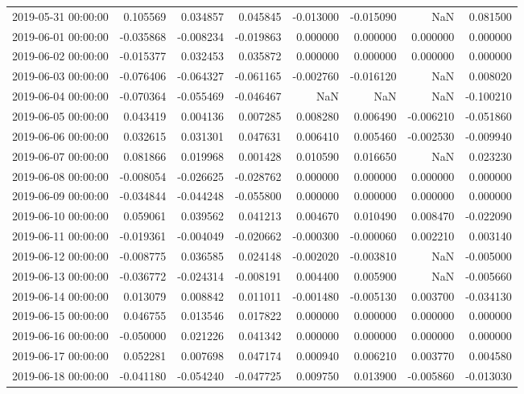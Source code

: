 \begin{tabular}{lrrrrrrr}
2019-05-31 00:00:00 & 0.105569 & 0.034857 & 0.045845 & -0.013000 & -0.015090 & NaN & 0.081500 \\
2019-06-01 00:00:00 & -0.035868 & -0.008234 & -0.019863 & 0.000000 & 0.000000 & 0.000000 & 0.000000 \\
2019-06-02 00:00:00 & -0.015377 & 0.032453 & 0.035872 & 0.000000 & 0.000000 & 0.000000 & 0.000000 \\
2019-06-03 00:00:00 & -0.076406 & -0.064327 & -0.061165 & -0.002760 & -0.016120 & NaN & 0.008020 \\
2019-06-04 00:00:00 & -0.070364 & -0.055469 & -0.046467 & NaN & NaN & NaN & -0.100210 \\
2019-06-05 00:00:00 & 0.043419 & 0.004136 & 0.007285 & 0.008280 & 0.006490 & -0.006210 & -0.051860 \\
2019-06-06 00:00:00 & 0.032615 & 0.031301 & 0.047631 & 0.006410 & 0.005460 & -0.002530 & -0.009940 \\
2019-06-07 00:00:00 & 0.081866 & 0.019968 & 0.001428 & 0.010590 & 0.016650 & NaN & 0.023230 \\
2019-06-08 00:00:00 & -0.008054 & -0.026625 & -0.028762 & 0.000000 & 0.000000 & 0.000000 & 0.000000 \\
2019-06-09 00:00:00 & -0.034844 & -0.044248 & -0.055800 & 0.000000 & 0.000000 & 0.000000 & 0.000000 \\
2019-06-10 00:00:00 & 0.059061 & 0.039562 & 0.041213 & 0.004670 & 0.010490 & 0.008470 & -0.022090 \\
2019-06-11 00:00:00 & -0.019361 & -0.004049 & -0.020662 & -0.000300 & -0.000060 & 0.002210 & 0.003140 \\
2019-06-12 00:00:00 & -0.008775 & 0.036585 & 0.024148 & -0.002020 & -0.003810 & NaN & -0.005000 \\
2019-06-13 00:00:00 & -0.036772 & -0.024314 & -0.008191 & 0.004400 & 0.005900 & NaN & -0.005660 \\
2019-06-14 00:00:00 & 0.013079 & 0.008842 & 0.011011 & -0.001480 & -0.005130 & 0.003700 & -0.034130 \\
2019-06-15 00:00:00 & 0.046755 & 0.013546 & 0.017822 & 0.000000 & 0.000000 & 0.000000 & 0.000000 \\
2019-06-16 00:00:00 & -0.050000 & 0.021226 & 0.041342 & 0.000000 & 0.000000 & 0.000000 & 0.000000 \\
2019-06-17 00:00:00 & 0.052281 & 0.007698 & 0.047174 & 0.000940 & 0.006210 & 0.003770 & 0.004580 \\
2019-06-18 00:00:00 & -0.041180 & -0.054240 & -0.047725 & 0.009750 & 0.013900 & -0.005860 & -0.013030 \\

\end{tabular}
